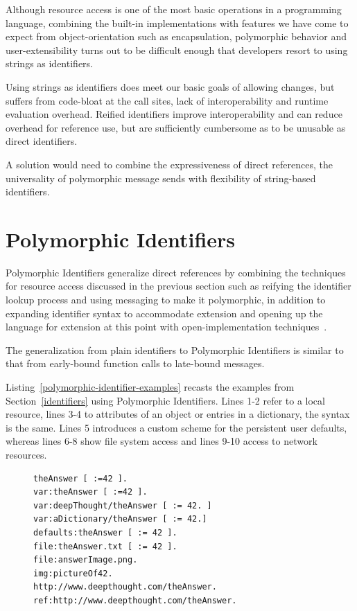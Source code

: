 \documentclass[preprint]{sigplanconf}
\begin{document}
Although resource access is one of the most basic operations in a programming language, combining 
the built-in implementations 
with features we have come to expect from object-orientation such as encapsulation, polymorphic
behavior and user-extensibility turns out to be difficult enough that developers resort to using
strings as identifiers.

Using strings as identifiers does meet our basic goals of allowing changes, but suffers from
code-bloat at the call sites, lack of interoperability and runtime evaluation overhead.  Reified 
identifiers improve interoperability and can reduce overhead for reference use, but are 
sufficiently cumbersome as to be unusable as direct identifiers.

A solution would need to combine the expressiveness of direct references, the universality
of polymorphic message sends with flexibility of string-based identifiers.



\section{Polymorphic Identifiers}
\label{polymorphic-identifiers}

Polymorphic Identifiers generalize direct references by combining the techniques for resource access
discussed in the previous section such as reifying the identifier lookup process and using messaging 
to make it polymorphic, in addition to expanding identifier syntax to accommodate extension and 
opening up the language for extension at this point  with open-implementation techniques~\cite{OpenImplementations}.

The generalization from plain identifiers to Polymorphic Identifiers is similar to that from early-bound
function calls to late-bound messages.

Listing~\ref{polymorphic-identifier-examples} recasts the examples from Section~\ref{identifiers} using
Polymorphic Identifiers.  Lines 1-2 refer to a local resource, lines 3-4 to attributes of an object or 
entries in a dictionary, the syntax is the same.  Lines 5 introduces a custom scheme for the persistent
user defaults, whereas lines 6-8 show file system access and lines 9-10 access to network resources.



\begin{figure}[htbp]
\begin{lstlisting}[style=numbers,label=polymorphic-identifier-examples,caption=Retrieve \mbox{[and store]} values via Polymorphic Identifiers.]
theAnswer [ :=42 ].
var:theAnswer [ :=42 ].
var:deepThought/theAnswer [ := 42. ]
var:aDictionary/theAnswer [ := 42.]
defaults:theAnswer [ := 42 ].
file:theAnswer.txt [ := 42 ].
file:answerImage.png.
img:pictureOf42.
http://www.deepthought.com/theAnswer.
ref:http://www.deepthought.com/theAnswer.
\end{lstlisting}
\end{figure}
\end{document}
